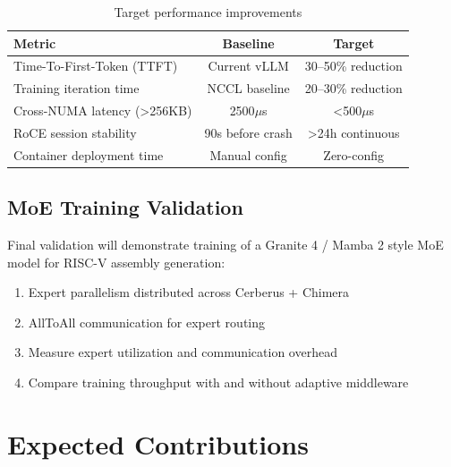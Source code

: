 \documentclass[11pt,letterpaper]{article}
\theoremstyle{definition}
\begin{document}
\begin{table}[htbp]
\centering
\caption{Target performance improvements}
\label{tab:metrics}
\begin{tabular}{@{}lcc@{}}
\toprule
\textbf{Metric} & \textbf{Baseline} & \textbf{Target} \\
\midrule
Time-To-First-Token (TTFT) & Current vLLM & 30--50\% reduction \\
Training iteration time & NCCL baseline & 20--30\% reduction \\
Cross-NUMA latency (>256KB) & 2500$\mu$s & <500$\mu$s \\
RoCE session stability & 90s before crash & >24h continuous \\
Container deployment time & Manual config & Zero-config \\
\bottomrule
\end{tabular}
\end{table}

\subsection{MoE Training Validation}

Final validation will demonstrate training of a Granite 4 / Mamba 2 style MoE model for RISC-V assembly generation:

\begin{enumerate}
    \item Expert parallelism distributed across Cerberus + Chimera
    \item AllToAll communication for expert routing
    \item Measure expert utilization and communication overhead
    \item Compare training throughput with and without adaptive middleware
\end{enumerate}

\section{Expected Contributions}
\end{document}
